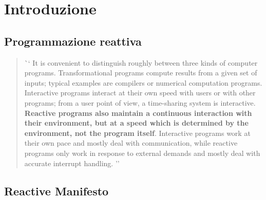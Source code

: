     \section{Introduzione}\label{sec:intro}

        \subsection{Programmazione reattiva}\label{subsec:react}

        \begin{frame}{\insertsectionhead}
            \begin{block}{\insertsubsectionhead}
                \smallskip
                \begin{quote}
                    \foreignlanguage{english}
                    `` It is convenient to distinguish roughly between three kinds of computer programs.
                    Transformational programs compute results from a given set of inputs;
                    typical examples are compilers or numerical computation programs.
                    Interactive programs interact at their own speed with users or with other programs;
                    from a user point of view, a time-sharing system is interactive.
                    \textbf{Reactive programs also maintain a continuous interaction with their environment, but at a speed which is determined by the environment, not the program itself}.
                    Interactive programs work at their own pace and mostly deal with communication, while reactive programs only work in response to external demands and mostly deal with accurate interrupt handling. ''
                \end{quote}
            \end{block}
        \end{frame}

        \subsection{Reactive Manifesto}\label{subsec:manifest}

